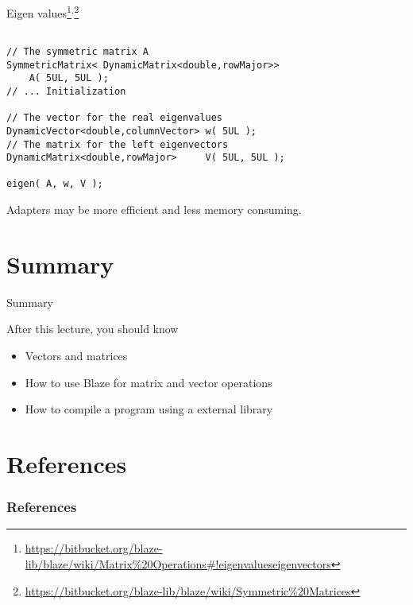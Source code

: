 \documentclass[\classoption]{beamer}
\begin{document}
\begin{frame}[fragile]{Eigen values\footnote{\tiny\url{https://bitbucket.org/blaze-lib/blaze/wiki/Matrix\%20Operations\#!eigenvalueseigenvectors}}$^,$\footnote{\tiny\url{https://bitbucket.org/blaze-lib/blaze/wiki/Symmetric\%20Matrices}}}
\begin{lstlisting}

// The symmetric matrix A
SymmetricMatrix< DynamicMatrix<double,rowMajor>> 
    A( 5UL, 5UL );  
// ... Initialization

// The vector for the real eigenvalues
DynamicVector<double,columnVector> w( 5UL );    
// The matrix for the left eigenvectors   
DynamicMatrix<double,rowMajor>     V( 5UL, 5UL );  

eigen( A, w, V );
\end{lstlisting}

\begin{center}
Adapters may be more efficient and less memory consuming.
\end{center}
\end{frame}


\section{Summary}
\begin{frame}{Summary}
\begin{block}{After this lecture, you should know}
\begin{itemize}
\item Vectors and matrices
\item How to use Blaze for matrix and vector operations
\item How to compile a program using a external library
\end{itemize}
\end{block}
\end{frame}


\section{References}

\begin{frame}[t, allowframebreaks]
\frametitle{References}


\end{frame}
\end{document}
